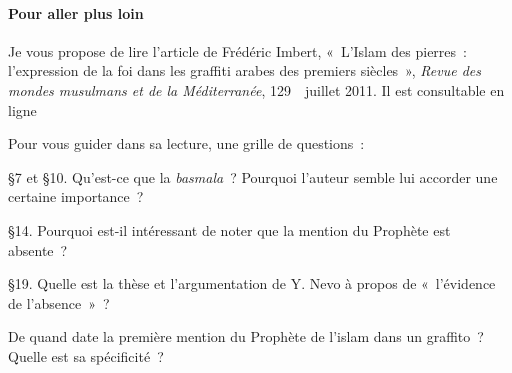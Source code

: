


 

\paragraph{Pour aller plus loin}

Je vous propose de lire l'article de Frédéric Imbert, «~L'Islam des
pierres~: l'expression de la foi dans les graffiti arabes des premiers
siècles~», \emph{Revue des mondes musulmans et de la Méditerranée},
129~\textbar~juillet 2011. Il est consultable en ligne 

Pour vous guider dans sa lecture, une grille de questions~:

§7 et §10. Qu'est-ce que la \emph{basmala}~? Pourquoi l'auteur semble
lui accorder une certaine importance~?

§14. Pourquoi est-il intéressant de noter que la mention du Prophète est
absente~?

§19. Quelle est la thèse et l'argumentation de Y. Nevo à propos de
«~l'évidence de l'absence~»~?

De quand date la première mention du Prophète de l'islam dans un
graffito~? Quelle est sa spécificité~? \\
 

